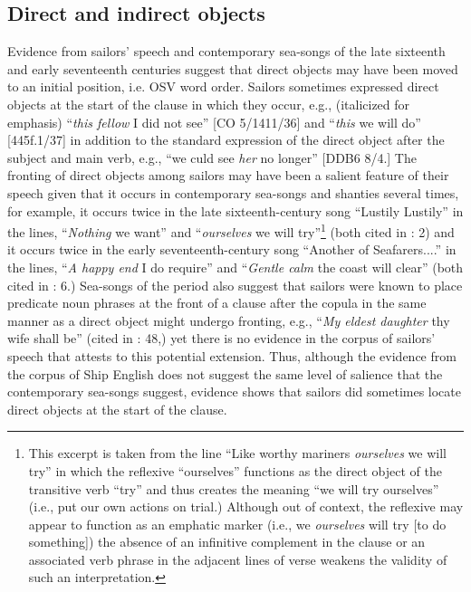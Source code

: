 \subsection{{Direct} {and} {indirect} {objects} }%

Evidence from sailors’ speech and contemporary sea-songs of the late sixteenth and early seventeenth centuries suggest that direct objects may have been moved to an initial position, i.e. OSV word order. Sailors sometimes expressed direct objects at the start of the clause in which they occur, e.g., (italicized for emphasis) “\textit{this fellow} I did not see” [CO 5/1411/36] and “\textit{this} we will do” [445f.1/37] in addition to the standard expression of the direct object after the subject and main verb, e.g., “we culd see \textit{her} no longer” [DDB6 8/4.] The fronting of direct objects among sailors may have been a salient feature of their speech given that it occurs in contemporary sea-songs and shanties several times, for example, it occurs twice in the late sixteenth-century song “Lustily Lustily” in the lines, “\textit{Nothing} we want” and “\textit{ourselves} we will try”\footnote{This excerpt is taken from the line “Like worthy mariners \textit{ourselves} we will try” in which the reflexive “ourselves” functions as the direct object of the transitive verb “try” and thus creates the meaning “we will try ourselves” (i.e., put our own actions on trial.) Although out of context, the reflexive may appear to function as an emphatic marker (i.e., we \textit{ourselves} will try [to do something]) the absence of an infinitive complement in the clause or an associated verb phrase in the adjacent lines of verse weakens the validity of such an interpretation.}  (both cited in \citealt{Palmer1986}: 2) and it occurs twice in the early seventeenth-century song “Another of Seafarers....” in the lines,  “\textit{A happy end} I do require” and “\textit{Gentle calm} the coast will clear” (both cited in \citealt{Palmer1986}: 6.) Sea-songs of the period also suggest that sailors were known to place predicate noun phrases at the front of a clause after the copula in the same manner as a direct object might undergo fronting, e.g., “\textit{My eldest daughter} thy wife shall be” (cited in \citealt{Palmer1986}: 48,) yet there is no evidence in the corpus of sailors’ speech that attests to this potential extension. Thus, although the evidence from the corpus of Ship English does not suggest the same level of salience that the contemporary sea-songs suggest, evidence shows that sailors did sometimes locate direct objects at the start of the clause. 

